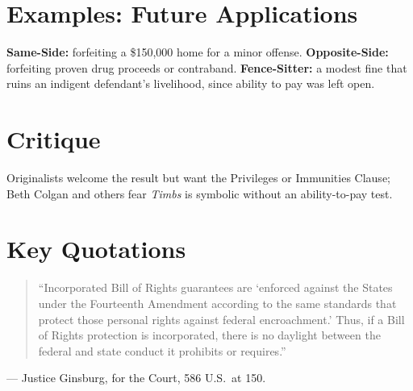 \documentclass[12pt]{article}
\begin{document}
\section{Examples: Future Applications}
\textbf{Same-Side:} forfeiting a \$150,000 home for a minor offense. \textbf{Opposite-Side:} forfeiting proven drug proceeds or contraband. \textbf{Fence-Sitter:} a modest fine that ruins an indigent defendant's livelihood, since ability to pay was left open.

\section{Critique}
Originalists welcome the result but want the Privileges or Immunities Clause; Beth Colgan and others fear \textit{Timbs} is symbolic without an ability-to-pay test.

\section{Key Quotations}
\begin{quote}
``Incorporated Bill of Rights guarantees are `enforced against the States under the Fourteenth Amendment according to the same standards that protect those personal rights against federal encroachment.' Thus, if a Bill of Rights protection is incorporated, there is no daylight between the federal and state conduct it prohibits or requires.''
\end{quote}
\noindent --- Justice Ginsburg, for the Court, 586 U.S.\ at 150.
\end{document}
